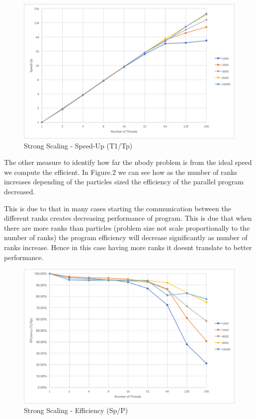 \documentclass[12pt]{article} %
\begin{document}
\begin{figure}[htb]
\caption{Strong Scaling - Speed-Up (T1/Tp)}\label{fig:benchmark01}
\centering
\includegraphics[width=15cm,keepaspectratio]{imgs/img01.png}
\end{figure} 

\newpage

The other measure to identify how far the nbody problem is from the ideal speed we compute the efficient. In Figure.2 we can see how as the number of ranks increases depending of the particles sized the efficiency of the parallel program decreased. 

This is due to that in many cases starting the communication between the different ranks creates decreasing performance of program. This is due that when there are more ranks than particles (problem size not scale proportionally to the number of ranks) the program efficiency will decrease significantly as number of ranks increase. Hence in this case having more ranks it doesnt translate to better performance.

\begin{figure}[htb]
\caption{Strong Scaling - Efficiency (Sp/P)}\label{fig:benchmark01}
\centering
\includegraphics[width=\textwidth,keepaspectratio]{imgs/img02.png}
\end{figure} 
\end{document}
